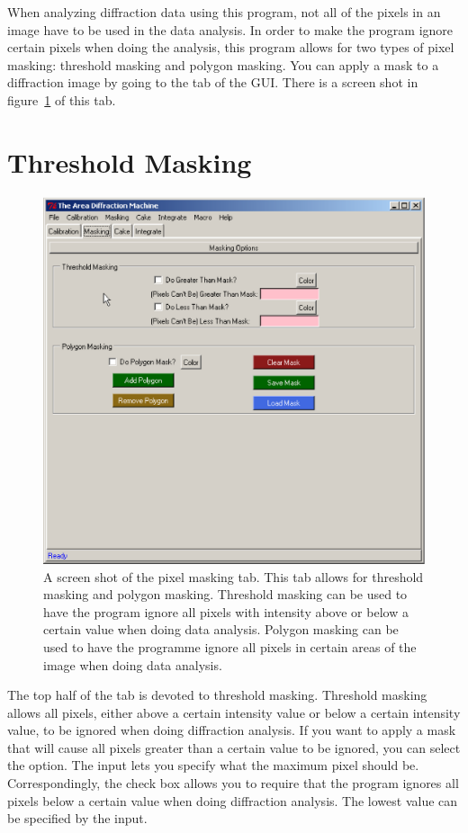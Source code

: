 
When analyzing diffraction data using this program,
not all of the pixels in an image have to be used in
the data analysis. In order to make the program
ignore certain pixels when doing the analysis, this
program allows for two types of pixel masking:
threshold masking and polygon masking. You can apply
a mask to a diffraction image by going to the
 tab of the GUI. There is a screen
shot in figure~\ref{masking_page} of this tab.

\section{Threshold Masking}

\begin{figure}
    \centering
    \includegraphics[scale=.75]{figures/masking_page.eps}
    \caption{A screen shot of the pixel masking tab. This
    tab allows for threshold masking and polygon masking. 
    Threshold masking can be used to have the program 
    ignore all pixels with intensity above or below
    a certain value when doing data analysis. 
    Polygon masking can be used to have the programme
    ignore all pixels in certain areas of the image
    when doing data analysis.} 
    \label{masking_page}
\end{figure}

The top half of the  tab is devoted to 
threshold masking. Threshold masking allows all pixels, 
either above a certain intensity value or below a certain 
intensity value, to be ignored when doing diffraction 
analysis. If you want to apply a mask that will cause 
all pixels greater than a certain value to be ignored,
you can select the  option.
The  input 
lets you specify what the maximum pixel should be.
Correspondingly, the  check box
allows you to require that the program ignores all
pixels below a certain value when doing diffraction
analysis. The lowest value can be specified by the 
 input. 

